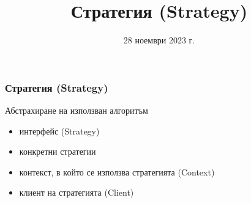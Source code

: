 \documentclass[alsotrans]{beamerswitch}
\title{Стратегия (Strategy)}
\date{28 ноември 2023 г.}
\begin{document}
\begin{frame}
  \titlepage
\end{frame}

\begin{frame}
  \frametitle{Стратегия (Strategy)}
  
  \begin{purpose}
    Абстрахиране на използван алгоритъм
  \end{purpose}

  \pause
  \vspace{2ex}
  \comps
  \begin{itemize}[<+->]
  \item интерфейс (Strategy)
  \item конкретни стратегии
  \item контекст, в който се използва стратегията (Context)
  \item клиент на стратегията (Client)
  \end{itemize}
\end{frame}
\end{document}
